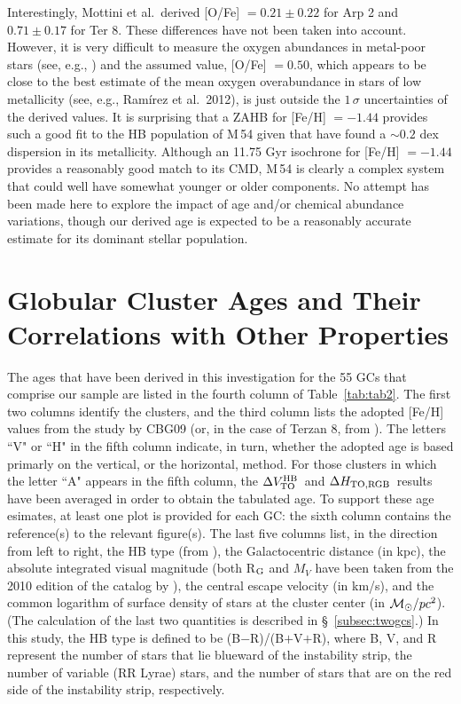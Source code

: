 \documentclass[12pt,preprint]{aastex}
\newcommand\msol{{\cal M_{\odot}}}
\newcommand\delv{\Delta V^{\rm HB}_{\rm TO}}
\newcommand\delc{\Delta H_{\rm TO,RGB}}
\begin{document}
Interestingly, Mottini et al.~derived [O/Fe] $= 0.21 \pm 0.22$ for Arp 2 and
$0.71 \pm 0.17$ for Ter 8.  These differences have not been taken into account.
However, it is very difficult to measure the oxygen abundances in metal-poor
stars (see, e.g., \citealt{rar06}) and the assumed value, [O/Fe] $= 0.50$,
which appears to be close to the best estimate of the mean oxygen overabundance
in stars of low metallicity (see, e.g., Ram\'irez et al.~2012), is just outside
the $1\,\sigma$ uncertainties of the derived values.  It is surprising that a
ZAHB for [Fe/H] $= -1.44$ provides such a good fit to the HB population of
M$\,$54 given that \citet{cbg10a} have found a $\sim 0.2$ dex dispersion in its
metallicity.  Although an 11.75 Gyr isochrone for [Fe/H] $= -1.44$ provides a
reasonably good match to its CMD, M$\,$54 is clearly a complex system that could
well have somewhat younger or older components.  No attempt has been made here
to explore the impact of age and/or chemical abundance variations, though our
derived age is expected to be a reasonably accurate estimate for its dominant
stellar population.


\section{Globular Cluster Ages and Their Correlations with Other Properties}
\label{sec:summary}

The ages that have been derived in this investigation for the 55 GCs that
comprise our sample are listed in the fourth column of Table~\ref{tab:tab2}.
The first two columns identify the clusters, and the third column lists the
adopted [Fe/H] values from the study by CBG09 (or, in the case of Terzan 8,
from \citealt{mwm08}).  The letters ``V" or ``H" in the fifth column indicate,
in turn, whether the adopted age is based primarly on the vertical, or the
horizontal, method.  For those clusters in which the letter ``A" appears in
the fifth column, the $\delv$\ and $\delc$\ results have been averaged in order
to obtain the tabulated age.   To support these age esimates, at least one
plot is provided for each GC: the sixth column contains the reference(s) to the
relevant figure(s).  The last five columns list, in the direction from left to
right, the HB type (from \citealt{mv05}), the Galactocentric distance (in kpc),
the absolute integrated visual magnitude (both R$_{\rm G}$ and $M_V$ have been
taken from the 2010 edition of the catalog by \citealt{har96}), the central
escape velocity (in km/s), and the common logarithm of surface density of stars
at the cluster center (in $\msol/pc^2$).  (The calculation of the last two
quantities is described in \S~\ref{subsec:twogcs}.)  In this study, the HB type
is defined to be (B$-$R)/(B$+$V$+$R), where B, V, and R represent the number of
stars that lie blueward of the instability strip, the number of variable
(RR Lyrae) stars, and the number of stars that are on the red side of the
instability strip, respectively.
\end{document}
